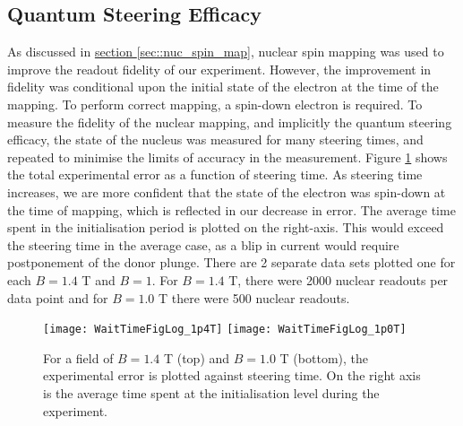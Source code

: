 \label{sec::results}
\subsection{Quantum Steering Efficacy}
	\label{sec::steering}

	As discussed in \hyperref[sec::nuc_spin_map]{section \ref{sec::nuc_spin_map}}, nuclear spin mapping was used to improve the readout fidelity of our experiment. However, the improvement in fidelity was conditional upon the initial state of the electron at the time of the mapping. To perform correct mapping, a spin-down electron is required. To measure the fidelity of the nuclear mapping, and implicitly the quantum steering efficacy, the state of the nucleus was measured for many steering times, and repeated to minimise the limits of accuracy in the measurement. Figure \ref{fig::wait_time} shows the total experimental error as a function of steering time. As steering time increases, we are more confident that the state of the electron was spin-down at the time of mapping, which is reflected in our decrease in error. The average time spent in the initialisation period is plotted on the right-axis. This would exceed the steering time in the average case, as a blip in current would require postponement of the donor plunge.	There are 2 separate data sets plotted one for each $B = 1.4$ T and $B = 1$. For $B = 1.4$ T, there were 2000 nuclear readouts per data point and for $B = 1.0$ T there were 500 nuclear readouts.
	
	\begin{figure}[htbp!]
		\centering
		\vspace{-1cm}
		\texttt{[image: WaitTimeFigLog\_1p4T]}
		\texttt{[image: WaitTimeFigLog\_1p0T]}
		\caption[Experimental fidelity with varying steering times.]{For a field of $B = 1.4$ T (top) and $B = 1.0$ T (bottom), the experimental error is plotted against steering time. On  the right axis is the average time spent at the initialisation level during the experiment.}
		\label{fig::wait_time}
	\end{figure}
		
